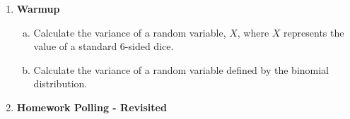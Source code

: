\documentclass[11pt]{article}
\newif\ifsolutions
\begin{document}
\maketitle


%
%
%

\begin{enumerate}

\item {\bf Warmup}
\begin{enumerate}[a)]
\item Calculate the variance of a random variable, $X$, where $X$ represents the value of a standard 6-sided dice.

\ifsolutions{\color{blue}{
\[ \Pr[X=i] = \frac{1}{6} \quad\text{for } i=1,2,\dots,6 \]
\[ E[X] = \sum_{i=1}^6 i\Pr[X=i] = \frac{1}{6}(1+2+3+\dots+6) = \frac{7}{2} \]
\[ E[X^2] = \sum_{i=1}^6 i^2\Pr[X=i] = \frac{1}{6}(1+4+9+\dots+36) = \frac{91}{6} \]
\[ Var[X] = E[X^2] - (E[X])^2 = \frac{35}{12} \]
}}
\fi


\item Calculate the variance of a random variable defined by the binomial distribution.

\ifsolutions{\color{blue}{
From HW12, we know that $X = \sum_{i=1}^n X_i$, where
\begin{equation*}
X_i = \begin{cases}
      1 &\mbox{with probability } p \\
      0 &\mbox{with probability } (1-p)
      \end{cases}
\end{equation*}
and all these $X_i$'s are i.i.d. Bernoulli r.v. So, $Var[X] = \sum_{i=1}^n Var[X_i]$.
\[ E[X_i] = 1\cdot p + 0\cdot (1-p) = p \]
\[ E[X_i^2] = 1^2\cdot p + 0^2\cdot (1-p) = p \]
\[ Var[X_i] = E[X_i^2] - (E[X_i])^2 = p - p^2 = p(1-p) \]
So, $Var[X] = np(1-p)$.
}}
\fi

\end{enumerate}

\vspace{25mm}

\item {\bf Homework Polling - Revisited} 


\end{enumerate}
\end{document}
